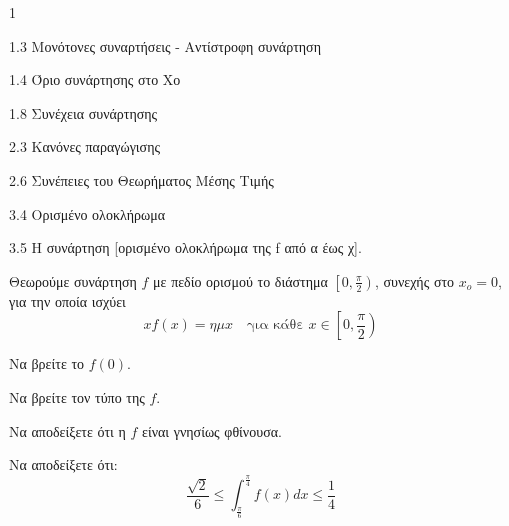 \begin{ylh}{1}
    \item 1.3 Μονότονες συναρτήσεις - Αντίστροφη συνάρτηση
    \item 1.4 Όριο συνάρτησης στο Χο
    \item 1.8 Συνέχεια συνάρτησης
    \item 2.3 Κανόνες παραγώγισης
    \item 2.6 Συνέπειες του Θεωρήματος Μέσης Τιμής
    \item 3.4 Ορισμένο ολοκλήρωμα
    \item 3.5 Η συνάρτηση [ορισμένο ολοκλήρωμα της f από α έως χ].
\end{ylh}
Θεωρούμε συνάρτηση $f$ με πεδίο ορισμού το διάστημα $\left[0, \frac{\pi}{2}\right)$, συνεχής στο $x_o = 0$, για την οποία ισχύει
\[ xf(x) = \eta\mu x \quad \text{για κάθε } x \in \left[0, \frac{\pi}{2}\right) \]
\begin{alist}
\item Να βρείτε το $f(0)$. 
\item Να βρείτε τον τύπο της $f$. 
\item Να αποδείξετε ότι η $f$ είναι γνησίως φθίνουσα. 
\item Να αποδείξετε ότι:
\[ \frac{\sqrt{2}}{6} \leq \int_{\frac{\pi}{6}}^{\frac{\pi}{4}} f(x)dx \leq \frac{1}{4} \] 
\end{alist}